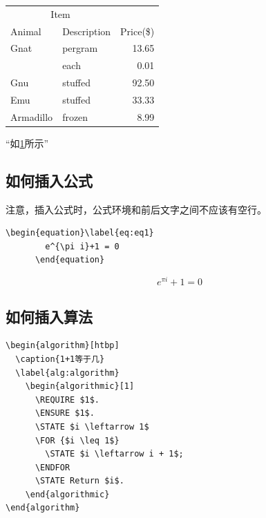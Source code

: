         \begin{table}[htpb]
          \centering
          \label{tab:1st}
          \begin{tabular}{@{}llr@{}}
            \toprule
            \multicolumn{2}{c}{Item} & \\
            \cmidrule(r){1-2}
            Animal    & Description  & Price(\$) \\
            \midrule
            Gnat      & pergram      & 13.65 \\
            & each         & 0.01 \\
            Gnu       & stuffed      & 92.50 \\
            Emu       & stuffed      & 33.33 \\
            Armadillo & frozen       & 8.99 \\
            \bottomrule
          \end{tabular}
        \end{table}

“如\cref{tab:1st}所示”


\subsection{如何插入公式}

注意，插入公式时，公式环境和前后文字之间不应该有空行。

\begin{center}
  \begin{minipage}{0.85\textwidth}
    \begin{Verbatim}[frame=single]
      \begin{equation}\label{eq:eq1}
        e^{\pi i}+1 = 0
      \end{equation}
    \end{Verbatim}
  \end{minipage}
\end{center}

      \begin{equation}\label{eq:eq1}
        e^{\pi i}+1 = 0
      \end{equation}

\subsection{如何插入算法}

\begin{center}
  \begin{minipage}{0.85\textwidth}
    \begin{Verbatim}[frame=single]
\begin{algorithm}[htbp]
  \caption{1+1等于几}
  \label{alg:algorithm}
    \begin{algorithmic}[1]
      \REQUIRE $1$.
      \ENSURE $1$.
      \STATE $i \leftarrow 1$
      \FOR {$i \leq 1$}
        \STATE $i \leftarrow i + 1$;
      \ENDFOR
      \STATE Return $i$.
    \end{algorithmic}
\end{algorithm}
    \end{Verbatim}
  \end{minipage}
\end{center}


